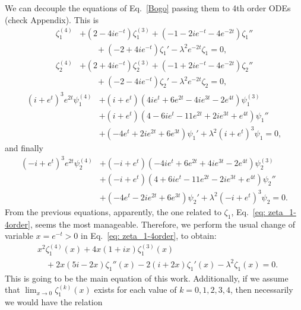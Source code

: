 \documentclass[
 aip,
 jmp,
 amsmath,amssymb,
 reprint,
 nofootinbib,
]{revtex4-2}
\begin{document}
We can decouple the equations of Eq.~\eqref{Bogo} passing them to 4th order ODEs (check Appendix). This is
\begin{equation} \label{eq: zeta_1-4order}
    \begin{aligned}
        \zeta_1^{(4)} & + \left(2-4i e^{-t}\right)\zeta_1^{(3)} + \left(-1-2i e^{-t} - 4 e^{-2t}\right)\zeta_1''\\
        &\qquad  + \left(-2+4i e^{-t}\right)\zeta_1'  -\lambda^2 e^{-2t}\zeta_1=0,
    \end{aligned}
\end{equation}
\begin{equation} %
    \begin{aligned}
        \zeta_2^{(4)} & + \left(2+4i e^{-t}\right)\zeta_2^{(3)}+ \left(-1+2i e^{-t} - 4 e^{-2t}\right)\zeta_2''\\
        & \qquad + \left(-2-4i e^{-t}\right)\zeta_2' -\lambda^2 e^{-2t}\zeta_2=0,
    \end{aligned}
\end{equation}
\begin{equation} 
    \begin{aligned}
        \left(i+ e^{t}\right)^3 e^{2t}\psi_1^{(4)} & + \left(i+e^t\right)\left(4i e^t + 6 e^{2t} - 4i e^{3t} - 2 e^{4t}\right)\psi_1^{(3)}\\
        & + \left(i+e^t\right)\left(4-6i e^t - 11 e^{2t} + 2i e^{3t} + e^{4t}\right)\psi_1''\\
        & + \left(-4 e^{t} + 2i e^{2t} + 6 e^{3t}\right)\psi_1' + \lambda^2\left(i+e^t\right)^3\psi_1=0,
    \end{aligned}
\end{equation}
and finally
\begin{equation} 
    \begin{aligned}
        \left(-i+ e^{t}\right)^3 e^{2t}\psi_2^{(4)} & + \left(-i+e^t\right)\left(-4i e^{t}+6e^{2t}+4i e^{3t} - 2 e^{4t}\right)\psi_2^{(3)}\\
        & + \left(-i+e^t\right)\left(4 + 6i e^{t} - 11 e^{2t} - 2i e^{3t}+e^{4t}\right)\psi_2''\\
        & + \left(-4 e^{t}-2i e^{2t}+6 e^{3t}\right)\psi_2'  +\lambda^2\left(-i+e^t\right)^3\psi_2=0.
    \end{aligned}
\end{equation}
From the previous equations, apparently, the one related to $\zeta_1$, Eq.~\eqref{eq: zeta_1-4order}, seems the most manageable. Therefore, we perform the usual change of variable $x=e^{-t}>0$ in Eq.~\eqref{eq: zeta_1-4order}, to obtain:
\begin{equation}\label{eq:zeta_1(x)}
\boxed{\begin{aligned}
& x^2\zeta_1^{(4)}(x) + 4x(1+ ix)\zeta_1^{(3)}(x) \\
& \quad + 2x (5i-2x)\zeta_1''(x) - 2(i+2x)\zeta_1'(x) - \lambda^2\zeta_1(x)=0.
\end{aligned}}
\end{equation}
This is going to be the main equation of this work. Additionally, if we assume that $\lim_{x\to 0}\zeta_1^{(k)}(x)$ exists for each value of $k=0,1,2,3, 4$, then necessarily we would have the relation
\end{document}
